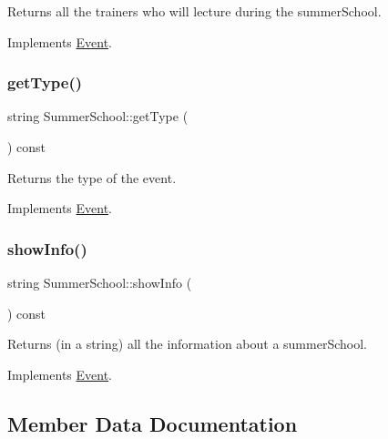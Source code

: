Returns all the trainers who will lecture during the summer\+School. 



Implements \mbox{\hyperlink{classEvent_a11aad3e5a7ee85bc61b6811d050c5d70}{Event}}.

\mbox{\label{classSummerSchool_a2ba547411ca8f161c2c579f9f55f913e}} 
\subsubsection{\texorpdfstring{get\+Type()}{getType()}}
{\footnotesize\ttfamily string Summer\+School\+::get\+Type (\begin{DoxyParamCaption}{ }\end{DoxyParamCaption}) const\hspace{0.3cm}{\ttfamily [virtual]}}



Returns the type of the event. 



Implements \mbox{\hyperlink{classEvent_a224dbd9a9aee5937ba0c8ea1a056af1f}{Event}}.

\mbox{\label{classSummerSchool_a61ac7307840f787e3de639d431248e26}} 
\subsubsection{\texorpdfstring{show\+Info()}{showInfo()}}
{\footnotesize\ttfamily string Summer\+School\+::show\+Info (\begin{DoxyParamCaption}{ }\end{DoxyParamCaption}) const\hspace{0.3cm}{\ttfamily [virtual]}}



Returns (in a string) all the information about a summer\+School. 



Implements \mbox{\hyperlink{classEvent_aaa38f467e933c57190d43351bdb817be}{Event}}.



\subsection{Member Data Documentation}
\mbox{\label{classSummerSchool_a7e6899945d6a486e9d1d1f581236630b}} 
